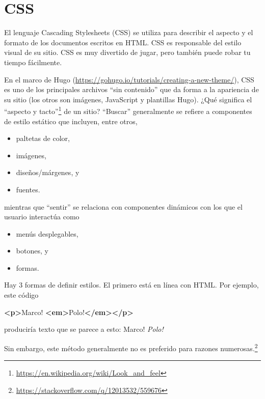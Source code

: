 \documentclass[12pt,]{krantz}
\makeatletter
\newenvironment{Shaded}{\begin{snugshade}}{\end{snugshade}}
\newcommand{\KeywordTok}[1]{\textcolor[rgb]{0.13,0.29,0.53}{\textbf{#1}}}
\newcommand{\NormalTok}[1]{#1}
\providecommand{\tightlist}{%
  \setlength{\itemsep}{0pt}\setlength{\parskip}{0pt}}
\renewcommand{\href}[2]{#2\footnote{\url{#1}}}
\newenvironment{kframe}{%
\medskip{}
\setlength{\fboxsep}{.8em}
 \def\at@end@of@kframe{}%
 \ifinner\ifhmode%
  \def\at@end@of@kframe{\end{minipage}}%
  \begin{minipage}{\columnwidth}%
 \fi\fi%
 \def\FrameCommand##1{\hskip\@totalleftmargin \hskip-\fboxsep
 \colorbox{shadecolor}{##1}\hskip-\fboxsep
     \hskip-\linewidth \hskip-\@totalleftmargin \hskip\columnwidth}%
 \MakeFramed {\advance\hsize-\width
   \@totalleftmargin\z@ \linewidth\hsize
   \@setminipage}}%
 {\par\unskip\endMakeFramed%
 \at@end@of@kframe}
\renewenvironment{Shaded}{\begin{kframe}}{\end{kframe}}
\theoremstyle{definition}
\theoremstyle{definition}
\theoremstyle{definition}
\theoremstyle{remark}
\makeatother
\begin{document}
\hypertarget{css}{%
\section{CSS}\label{css}}

El lenguaje Cascading Stylesheets  (CSS) se utiliza para
describir el aspecto y el formato de los documentos escritos en HTML.
CSS es responsable del estilo visual de su sitio. CSS es muy divertido
de jugar, pero también puede robar tu tiempo fácilmente.

En el marco de Hugo
(\url{https://gohugo.io/tutorials/creating-a-new-theme/}), CSS es uno de
los principales archivos ``sin contenido'' que da forma a la apariencia
de su sitio (los otros son imágenes, JavaScript y plantillas Hugo). ¿Qué
significa el
\href{https://en.wikipedia.org/wiki/Look_and_feel}{``aspecto y tacto''}
de un sitio? ``Buscar'' generalmente se refiere a componentes de estilo
estático que incluyen, entre otros,

\begin{itemize}
\tightlist
\item
  paltetas de color,
\item
  imágenes,
\item
  diseños/márgenes, y
\item
  fuentes.
\end{itemize}

mientras que ``sentir'' se relaciona con componentes dinámicos con los
que el usuario interactúa como

\begin{itemize}
\tightlist
\item
  menús desplegables,
\item
  botones, y
\item
  formas.
\end{itemize}

Hay 3 formas de definir estilos. El primero está en línea con HTML. Por
ejemplo, este código

\begin{Shaded}
\begin{Highlighting}[]
\KeywordTok{<p>}\NormalTok{Marco! }\KeywordTok{<em>}\NormalTok{Polo!}\KeywordTok{</em></p>} 
\end{Highlighting}
\end{Shaded}

produciría texto que se parece a esto: Marco! \emph{Polo!}

Sin embargo, este método generalmente no es preferido para
\href{https://stackoverflow.com/q/12013532/559676}{razones numerosas.}
\end{document}
